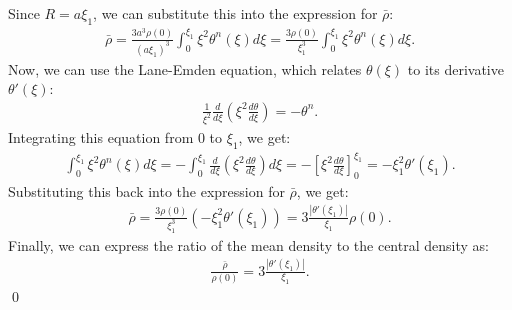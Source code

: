 Since $R = a\xi_1$, we can substitute this into the expression for $\bar{\rho}$:
\begin{align}
    \bar{\rho} = \frac{3a^3 \rho(0)}{(a\xi_1)^3} \int_0^{\xi_1} \xi^2 \theta^n(\xi) d\xi = \frac{3 \rho(0)}{\xi_1^3} \int_0^{\xi_1} \xi^2 \theta^n(\xi) d\xi.
\end{align}
Now, we can use the Lane-Emden equation, which relates $\theta(\xi)$ to its derivative $\theta'(\xi)$:
\begin{align}
    \frac{1}{\xi^2} \frac{d}{d\xi} \left( \xi^2 \frac{d\theta}{d\xi} \right) = -\theta^n.
\end{align}
Integrating this equation from $0$ to $\xi_1$, we get:
\begin{align}
    \int_0^{\xi_1} \xi^2 \theta^n(\xi) d\xi = -\int_0^{\xi_1} \frac{d}{d\xi} \left( \xi^2 \frac{d\theta}{d\xi} \right) d\xi = -\left[ \xi^2 \frac{d\theta}{d\xi} \right]_0^{\xi_1} = -\xi_1^2 \theta'(\xi_1).
\end{align}
Substituting this back into the expression for $\bar{\rho}$, we get:
\begin{align}
    \bar{\rho} = \frac{3 \rho(0)}{\xi_1^3} (-\xi_1^2 \theta'(\xi_1)) = 3 \frac{|\theta'(\xi_1)|}{\xi_1} \rho(0).
\end{align}
Finally, we can express the ratio of the mean density to the central density as:
\begin{align}
    \frac{\bar{\rho}}{\rho(0)} = 3 \frac{|\theta'(\xi_1)|}{\xi_1}.
\end{align}\qed




